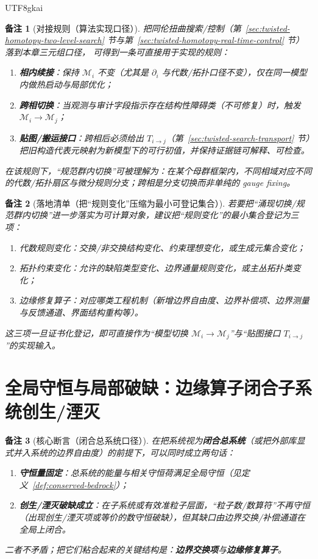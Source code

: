 \documentclass[12pt]{article}
\newtheorem{remark}{备注}[section]
\begin{document}
\begin{CJK*}{UTF8}{gkai}
\begin{remark}[对接规则（算法实现口径）]
把同伦扭曲搜索/控制（第~\ref{sec:twisted-homotopy-two-level-search} 节与第~\ref{sec:twisted-homotopy-real-time-control} 节）落到本章三元组口径，
  可得到一条可直接用于实现的规则：
\begin{enumerate}
  \item \textbf{相内续接}：保持 $\mathcal{M}_i$ 不变（尤其是 $\partial_i$ 与代数/拓扑口径不变），仅在同一模型内做热启动与局部优化；
  \item \textbf{跨相切换}：当观测与审计字段指示存在结构性障碍类（不可修复）时，触发 $\mathcal{M}_i\to\mathcal{M}_j$；
  \item \textbf{贴图/搬运接口}：跨相后必须给出 $T_{i\to j}$（第~\ref{sec:twisted-search-transport} 节）把旧构造代表元映射为新模型下的可行初值，并保持证据链可解释、可检查。
\end{enumerate}
在该规则下，“规范群内切换”可被理解为：在某个母群框架内，不同相域对应不同的代数/拓扑扇区与微分规则分支；跨相是分支切换而非单纯的 gauge fixing。
\end{remark}

\begin{remark}[落地清单（把“规则变化”压缩为最小可登记集合）]
若要把“涌现切换/规范群内切换”进一步落实为可计算对象，建议把“规则变化”的最小集合登记为三项：
\begin{enumerate}
  \item 代数规则变化：交换/非交换结构变化、约束理想变化，或生成元集合变化；
  \item 拓扑约束变化：允许的缺陷类型变化、边界通量规则变化，或主丛拓扑类变化；
  \item 边缘修复算子：对应哪类工程机制（新增边界自由度、边界补偿项、边界测量与反馈通道、界面结构重构等）。
\end{enumerate}
这三项一旦证书化登记，即可直接作为“模型切换 $\mathcal{M}_i\to\mathcal{M}_j$”与“贴图接口 $T_{i\to j}$”的实现输入。
\end{remark}

\section{全局守恒与局部破缺：边缘算子闭合子系统创生/湮灭}
\label{sec:global-conservation-local-breaking}

\begin{remark}[核心断言（闭合总系统口径）]
在把系统视为\textbf{闭合总系统}（或把外部库显式并入系统的边界自由度）的前提下，可以同时成立两句话：
\begin{enumerate}
  \item \textbf{守恒量固定}：总系统的能量与相关守恒荷满足全局守恒（见定义~\ref{def:conserved-bedrock}）；
  \item \textbf{创生/湮灭破缺成立}：在子系统或有效准粒子层面，“粒子数/数算符”不再守恒（出现创生/湮灭项或等价的数守恒破缺），但其缺口由边界交换/补偿通道在全局上闭合。
\end{enumerate}
二者不矛盾；把它们粘合起来的关键结构是：\textbf{边界交换项}与\textbf{边缘修复算子}。
\end{remark}


\end{CJK*}
\end{document}
